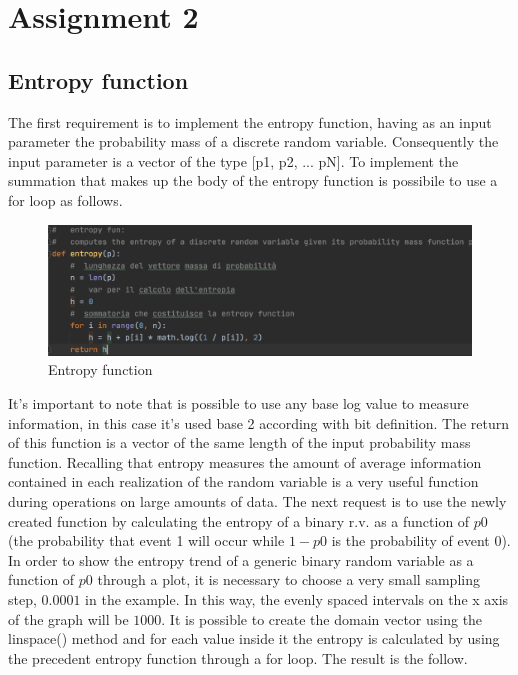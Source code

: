 \documentclass[12pt]{report}
\begin{document}
\chapter{Assignment 2}
\section{Entropy function}
The first requirement is to implement the entropy function, having as an input parameter the probability mass of a discrete random variable. Consequently the input parameter is a vector of the type [p1, p2, ... pN]. To implement the summation that makes up the body of the entropy function is possibile to use a for loop as follows.

\begin{figure}[h!]
    \centering
    \includegraphics[width=14cm]{Pictures/entropy.png}
    \caption{Entropy function}
\end{figure}

It's important to note that is possible to use any base log value to measure information, in this case it's used base 2 according with bit definition.
The return of this function is a vector of the same length of the input probability mass function.
Recalling that entropy measures the amount of average information contained in each realization of the random variable is a very useful function during operations on large amounts of data. The next request is to use the newly created function by calculating the entropy of a binary r.v. as a function of $p0$ (the probability that event 1 will occur while $1 - p0$ is the probability of event $0$). In order to show the entropy trend of a generic binary random variable as a function of $p0$ through a plot, it is necessary to choose a very small sampling step, $0.0001$ in the example. In this way, the evenly spaced intervals on the x axis of the graph will be $1000$. It is possible to create the domain vector using the linspace() method and for each value inside it the entropy is calculated by using the precedent entropy function through a for loop. The result is the follow.
\end{document}
